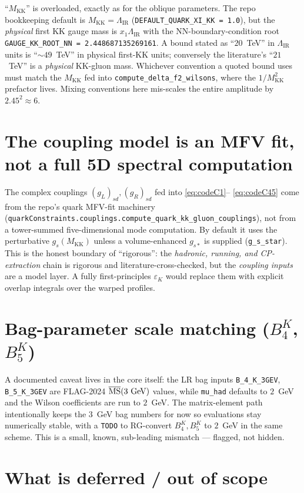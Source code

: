\documentclass[11pt]{article}
\newcommand{\MKK}{M_{\mathrm{KK}}}
\newcommand{\LIR}{\Lambda_{\mathrm{IR}}}
\newcommand{\epsK}{\varepsilon_K}
\newcommand{\gss}{g_{s*}}
\newcommand{\code}[1]{\texttt{#1}}
\theoremstyle{definition}
\begin{document}
``$\MKK$'' is overloaded, exactly as for the oblique parameters. The repo
bookkeeping default is $\MKK=\LIR$ (\code{DEFAULT\_QUARK\_XI\_KK = 1.0}), but the
\emph{physical} first KK gauge mass is $x_1\LIR$ with the NN-boundary-condition
root \code{GAUGE\_KK\_ROOT\_NN = 2.448687135269161}. A bound stated as ``$20$~TeV''
in $\LIR$ units is ``$\sim49$~TeV'' in physical first-KK units; conversely the
literature's ``$21$~TeV'' is a \emph{physical} KK-gluon mass. Whichever convention
a quoted bound uses must match the $\MKK$ fed into
\code{compute\_delta\_f2\_wilsons}, where the $1/\MKK^2$ prefactor lives. Mixing
conventions here mis-scales the entire amplitude by $2.45^2\approx6$.

\section{The coupling model is an MFV fit, not a full 5D spectral computation}
\label{sec:couplingmodel}

The complex couplings $(g_L)_{sd},(g_R)_{sd}$ fed into \eqref{eq:codeC1}--%
\eqref{eq:codeC45} come from the repo's quark MFV-fit machinery
(\code{quarkConstraints.couplings.compute\_quark\_kk\_gluon\_couplings}), not from
a tower-summed five-dimensional mode computation. By default it uses the
perturbative $g_s(\MKK)$ unless a volume-enhanced $\gss$ is supplied
(\code{g\_s\_star}). This is the honest boundary of ``rigorous'': the
\emph{hadronic, running, and CP-extraction} chain is rigorous and literature-cross-checked,
but the \emph{coupling inputs} are a model layer. A fully first-principles
$\epsK$ would replace them with explicit overlap integrals over the warped
profiles.

\section{Bag-parameter scale matching ($B_4^K$, $B_5^K$)}
\label{sec:bagscale}

A documented caveat lives in the core itself: the LR bag inputs
\code{B\_4\_K\_3GEV}, \code{B\_5\_K\_3GEV} are FLAG-2024
$\overline{\rm MS}(3~\text{GeV})$ values, while \code{mu\_had} defaults to
$2$~GeV and the Wilson coefficients are run to $2$~GeV. The matrix-element path
intentionally keeps the $3$~GeV bag numbers for now so evaluations stay
numerically stable, with a \code{TODO} to RG-convert $B_4^K,B_5^K$ to $2$~GeV in
the same scheme. This is a small, known, sub-leading mismatch --- flagged, not
hidden.

\section{What is deferred / out of scope}
\label{sec:deferred}
\end{document}
